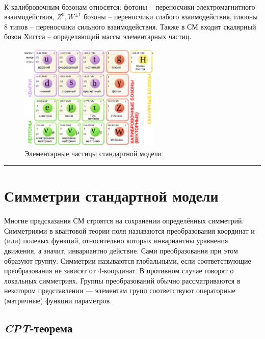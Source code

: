 \documentclass[a4paper,12pt]{article} %
\begin{document}
\paragraph{} К калибровочным бозонам относятся: фотоны -- переносчики электромагнитного взаимодействия, $Z^0, W^{\pm 1}$ бозоны -- переносчики слабого взаимодействия, глюоны 8 типов -- переносчики сильного взаимодействия. Также в СМ входит скалярный бозон Хиггса -- определяющий массы элементарных частиц.

\begin{figure}[h]
\centering
\includegraphics[width=0.6\textwidth]{sm_chart_ru.pdf}
\caption{Элементарные частицы стандартной модели}
\label{fig:sm_chart}
\end{figure}

\medskip\hrule\medskip

\section{Симметрии стандартной модели}

\paragraph{} Многие предсказания СМ строятся на сохранении определённых симметрий. Симметриями в квантовой теории поля называются преобразования координат и (или) полевых функций, относительно которых инвариантны уравнения движения, а значит, инвариантно действие. Сами преобразования при этом образуют группу. Симметрии называются глобальными, если соответствующие преобразования не зависят от 4-координат. В противном случае говорят о локальных симметриях. Группы преобразований обычно рассматриваются в некотором представлении — элементам групп соответствуют операторные (матричные) функции параметров. 

\subsection{\textit{CPT}-теорема}
\end{document}
